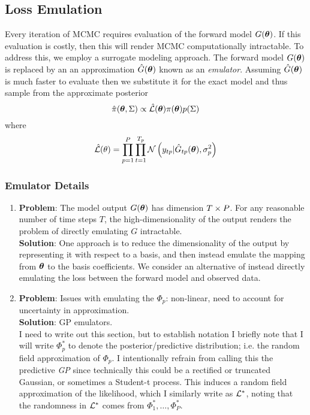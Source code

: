 \documentclass[12pt]{article}
\begin{document}
\subsection{Loss Emulation}
Every iteration of MCMC requires evaluation of the forward model $G(\boldsymbol{\theta})$. If this evaluation is costly, then this will render MCMC computationally intractable. To address this, we employ a surrogate modeling approach. 
The forward model $G(\boldsymbol{\theta})$ is replaced by an an approximation $\hat{G}(\boldsymbol{\theta})$ known as an \textit{emulator}. Assuming $\hat{G}(\boldsymbol{\theta})$ is much faster to evaluate then we substitute it for the exact model and thus 
sample from the approximate posterior
 \[\hat{\pi}(\boldsymbol{\theta}, \Sigma) \propto \hat{\mathcal{L}}(\boldsymbol{\theta})\pi(\boldsymbol{\theta})p(\Sigma)\]
 where 
 \begin{align*}
\hat{\mathcal{L}}(\theta) = \prod_{p = 1}^{P} \prod_{t = 1}^{T_{p}} \mathcal{N}\left(y_{tp}| \hat{G}_{tp}(\boldsymbol{\theta}), \sigma_p^2 \right)
\end{align*}
 
\subsubsection{Emulator Details}
\begin{enumerate}
\item \textbf{Problem}: The model output $G(\boldsymbol{\theta})$ has dimension $T \times P$. For any reasonable number of time steps $T$, the high-dimensionality of the output renders the problem of directly emulating $G$ intractable.  \\
	\textbf{Solution}: One approach is to reduce the dimensionality of the output by representing it with respect to a basis, and then instead emulate the mapping from $\boldsymbol{\theta}$ to the basis coefficients. We consider an alternative 
	of instead directly emulating the loss between the forward model and observed data. 
	
\item \textbf{Problem}: Issues with emulating the $\Phi_p$: non-linear, need to account for uncertainty in approximation. \\
\textbf{Solution}: GP emulators. \\
I need to write out this section, but to establish notation I briefly note that I will write $\Phi_p^*$ to denote the posterior/predictive distribution; i.e. the random field approximation of $\Phi_p$. I intentionally refrain from calling 
this the predictive \textit{GP} since technically this could be a rectified or truncated Gaussian, or sometimes a Student-t process. This induces a random field approximation of the likelihood, which I similarly write as 
$\mathcal{L}^*$, noting that the randomness in $\mathcal{L}^*$ comes from $\Phi^*_1, \dots, \Phi^*_P$. 
	
\end{enumerate}
\end{document}
